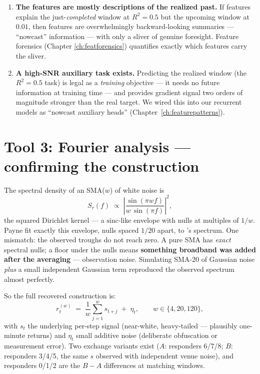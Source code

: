 \begin{enumerate}
\item \textbf{The features are mostly descriptions of the realized past.}
  If features explain the just-\emph{completed} window at $R^2=0.5$ but the
  upcoming window at $0.01$, then features are overwhelmingly
  backward-looking summaries --- ``nowcast'' information --- with only a
  sliver of genuine foresight. Feature forensics (Chapter
  \ref{ch:featforensics}) quantifies exactly which features carry the
  sliver.
\item \textbf{A high-SNR auxiliary task exists.} Predicting the realized
  window (the $R^2=0.5$ task) is legal as a \emph{training} objective ---
  it needs no future information at training time --- and provides
  gradient signal two orders of magnitude stronger than the real target.
  We wired this into our recurrent models as ``nowcast auxiliary heads''
  (Chapter~\ref{ch:featurepatterns}).
\end{enumerate}

\section{Tool 3: Fourier analysis --- confirming the construction}
\label{sec:fourier}

The spectral density of an SMA($w$) of white noise is
\[
S_r(f) \;\propto\; \left|\frac{\sin(\pi w f)}{w\,\sin(\pi f)}\right|^2,
\]
the squared Dirichlet kernel --- a $\mathrm{sinc}$-like envelope with nulls
at multiples of $1/w$. Payne fit exactly this envelope, nulls spaced $1/20$
apart, to 's spectrum. One mismatch: the observed troughs do not
reach zero. A pure SMA has \emph{exact} spectral nulls; a floor under the
nulls means \textbf{something broadband was added after the averaging} ---
observation noise. Simulating SMA-20 of Gaussian noise \emph{plus} a small
independent Gaussian term reproduced the observed spectrum almost perfectly.

So the full recovered construction is:
\begin{equation}
r^{(w)}_t \;=\; \frac{1}{w}\sum_{j=1}^{w} s_{t+j} \;+\; \eta_t,
\qquad w \in \{4, 20, 120\},
\label{eq:construction}
\end{equation}
with $s_t$ the underlying per-step signal (near-white, heavy-tailed ---
plausibly one-minute returns) and $\eta_t$ small additive noise (deliberate
obfuscation or measurement error). Two exchange variants exist ($A$: responders
6/7/8; $B$: responders 3/4/5, the same $s$ observed with independent venue
noise), and responders 0/1/2 are the $B{-}A$ differences at matching windows.

